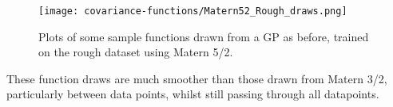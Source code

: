 \begin{figure}[H]
    \texttt{[image: covariance-functions/Matern52\_Rough\_draws.png]}
    \caption{
        Plots of some sample functions drawn from a GP as before, trained on the rough dataset using Matern 5/2.
    }
\end{figure}
These function draws are much smoother than those drawn from Matern 3/2, particularly between data points, whilst still passing through all datapoints.





% 
% 
% 


% 
% 
% 
% 
% 
% 
% 
% 


